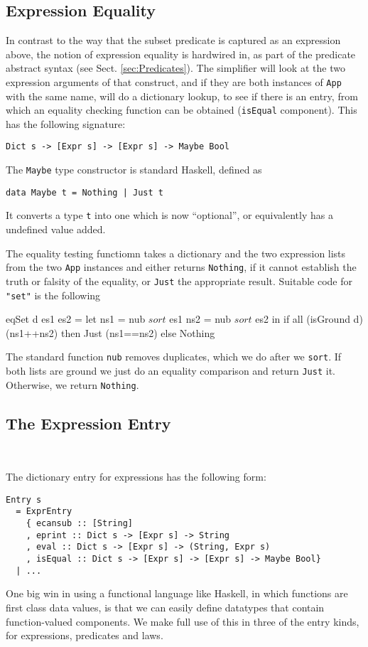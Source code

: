 \subsection{Expression Equality}

In contrast to the way that the subset predicate
is captured as an expression above,
the notion of expression equality is hardwired in,
as part of the predicate abstract syntax (see Sect. \ref{sec:Predicates}).
The simplifier will look at the two expression
arguments of that construct,
and if they are both instances of \texttt{App} with the same name,
will do a dictionary lookup, to see if there
is an entry, from
which an equality checking function can be obtained (\texttt{isEqual} component).
This has the following signature:
\begin{verbatim}
Dict s -> [Expr s] -> [Expr s] -> Maybe Bool
\end{verbatim}
The \texttt{Maybe} type constructor is standard Haskell, defined as
\begin{verbatim}
data Maybe t = Nothing | Just t
\end{verbatim}
It converts a type \texttt{t} into one which is now ``optional'',
or equivalently has a undefined value added.

The equality testing functiomn takes a dictionary and the two expression
lists from the two \texttt{App} instances
and either returns \texttt{Nothing},
if it cannot establish the truth or falsity of the equality,
or \texttt{Just} the appropriate result.
Suitable code for \verb$"set"$ is the following
\begin{code}
eqSet d es1 es2
 = let ns1 = nub $ sort $ es1
       ns2 = nub $ sort $ es2
   in if all (isGround d) (ns1++ns2)
      then Just (ns1==ns2)
      else Nothing
\end{code}
The standard function \texttt{nub} removes duplicates,
which we do after we \texttt{sort}.
If both lists are ground we just do an equality comparison
and return \texttt{Just} it. Otherwise, we return \texttt{Nothing}.




\subsection{The Expression Entry}~

The dictionary entry for expressions has the following form:
\begin{verbatim}
Entry s
  = ExprEntry
    { ecansub :: [String]
    , eprint :: Dict s -> [Expr s] -> String
    , eval :: Dict s -> [Expr s] -> (String, Expr s)
    , isEqual :: Dict s -> [Expr s] -> [Expr s] -> Maybe Bool}
  | ...
\end{verbatim}
One big win in using a functional language like Haskell,
in which functions are first class data values,
is that we can easily define datatypes that
contain function-valued components.
We make full use of this in three of the entry kinds,
for expressions, predicates and laws.

